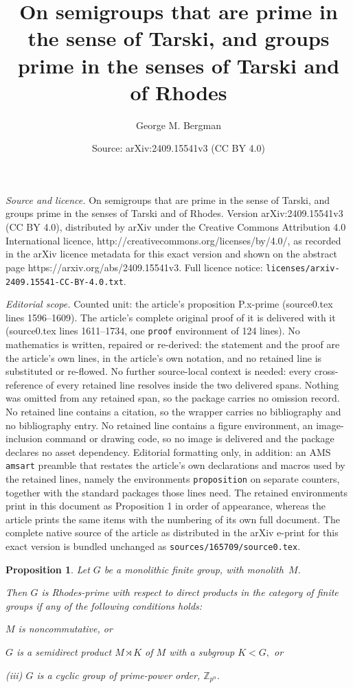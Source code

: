 \documentclass[10pt,a4paper]{amsart}
\title{On semigroups that are prime in the sense of Tarski, and groups prime in the senses of Tarski and of Rhodes}
\author{George M. Bergman}
\date{Source: arXiv:2409.15541v3 (CC BY 4.0)}
\newtheorem{proposition}{Proposition}
\newcommand{\Z}{\mathbb{Z}}
\begin{document}
\maketitle

\noindent\emph{Source and licence.} On semigroups that are prime in the sense of Tarski, and groups prime in the senses of Tarski and of Rhodes. Version arXiv:2409.15541v3 (CC BY 4.0), distributed by arXiv under the Creative Commons Attribution 4.0 International licence, http://creativecommons.org/licenses/by/4.0/, as recorded in the arXiv licence metadata for this exact version and shown on the abstract page https://arxiv.org/abs/2409.15541v3. Full licence notice: \texttt{licenses/arxiv-2409.15541-CC-BY-4.0.txt}.\par\smallskip

\noindent\textit{Editorial scope.} Counted unit: the article's proposition P.x-prime (source0.tex lines 1596--1609). The article's complete original proof of it is delivered with it (source0.tex lines 1611--1734, one \texttt{proof} environment of 124 lines). No mathematics is written, repaired or re-derived: the statement and the proof are the article's own lines, in the article's own notation, and no retained line is substituted or re-flowed.  No further source-local context is needed: every cross-reference of every retained line resolves inside the two delivered spans.  Nothing was omitted from any retained span, so the package carries no omission record.  No retained line contains a citation, so the wrapper carries no bibliography and no bibliography entry.  No retained line contains a figure environment, an image-inclusion command or drawing code, so no image is delivered and the package declares no asset dependency.  Editorial formatting only, in addition: an AMS \texttt{amsart} preamble that restates the article's own declarations and macros used by the retained lines, namely the environments \texttt{proposition} on separate counters, together with the standard packages those lines need.  The retained environments print in this document as Proposition 1 in order of appearance, whereas the article prints the same items with the numbering of its own full document.  The complete native source of the article as distributed in the arXiv e-print for this exact version is bundled unchanged as \texttt{sources/165709/source0.tex}.
\begin{proposition}\label{P.x-prime}
Let $G$ be a monolithic finite group, with monolith~$M.$

Then $G$ is Rhodes-prime with respect to direct products
in the category of finite groups if any
of the following conditions holds:

\hspace{.5em}{\rm(i)} $M$ is noncommutative, or

\hspace{.25em}{\rm(ii)} $G$ is a semidirect product
$M\rtimes K$ of $M$ with a subgroup $K<G,$ or

{\rm(iii)} $G$ is a cyclic group of prime-power order, $\Z_{p^n}.$
\end{proposition}
\end{document}
